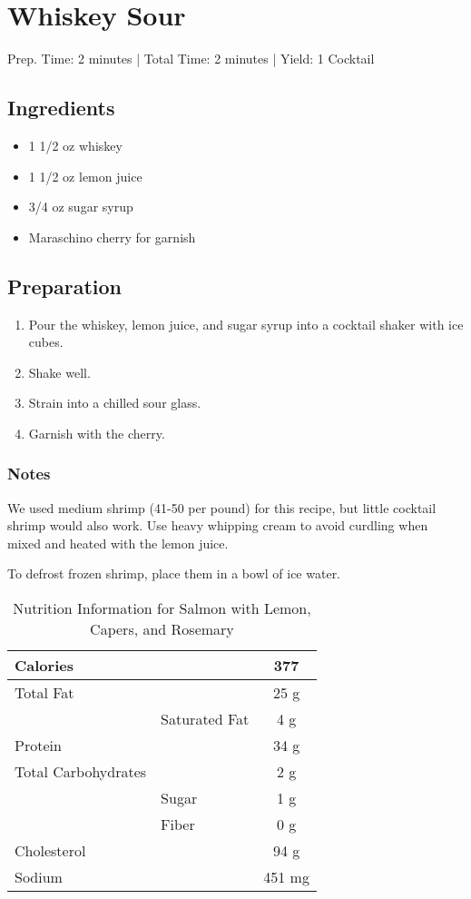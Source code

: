 \section{Whiskey Sour}

\begin{center}
Prep. Time: 2 minutes |
Total Time: 2 minutes | 
Yield: 1 Cocktail
\end{center}

\subsection{Ingredients}
\begin{itemize}
    \item 1 1/2 oz whiskey
    \item 1 1/2 oz lemon juice
    \item 3/4 oz sugar syrup
    \item Maraschino cherry for garnish
\end{itemize}

\subsection{Preparation}
\begin{enumerate}
    \item Pour the whiskey, lemon juice, and sugar syrup into a cocktail shaker with ice cubes.
    \item Shake well.
    \item Strain into a chilled sour glass.
    \item Garnish with the cherry.
\end{enumerate}

\subsubsection{Notes}
We used medium shrimp (41-50 per pound) for this recipe, but little cocktail shrimp would also work. Use heavy whipping cream to avoid curdling when mixed and heated with the lemon juice.

\noindent *To defrost frozen shrimp, place them in a bowl of ice water.

\begin{table}%
    \centering
    \begin{tabular}{|ll|c|}
        \hline
        Calories & & 377\\
        \hline
        Total Fat & & 25 g \\
        & Saturated Fat & 4 g\\
        \hline
        Protein & & 34 g\\
        \hline
        Total Carbohydrates & & 2 g\\
        & Sugar & 1 g\\
        & Fiber & 0 g\\
        \hline
        Cholesterol & & 94 g\\
        \hline
        Sodium & & 451 mg\\
        \hline
    \end{tabular}
    \caption{Nutrition Information for Salmon with Lemon, Capers, and Rosemary}
\end{table}
